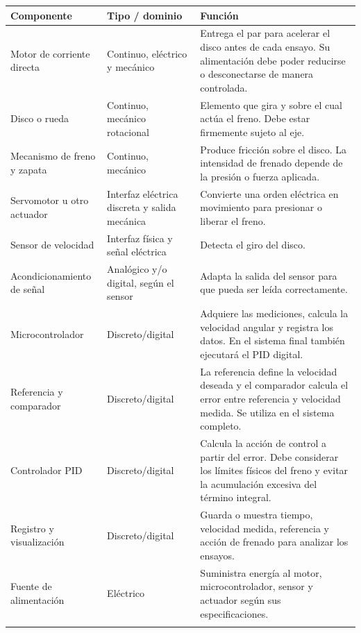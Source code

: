\documentclass[9pt,a4paper,twocolumn]{extarticle}
\renewcommand{\arraystretch}{1.08}
\begin{document}
\begin{center}\begingroup\setlength{\tabcolsep}{2pt}\renewcommand{\arraystretch}{1.15}\scriptsize
\begin{tabularx}{\columnwidth}{@{}YYY@{}}
\toprule
\textbf{Componente} & \textbf{Tipo / dominio} & \textbf{Función}\\
\midrule
Motor de corriente directa & Continuo, eléctrico y mecánico & Entrega el par para acelerar el disco antes de cada ensayo. Su alimentación debe poder reducirse o desconectarse de manera controlada.\\
\addlinespace[2pt]
Disco o rueda & Continuo, mecánico rotacional & Elemento que gira y sobre el cual actúa el freno. Debe estar firmemente sujeto al eje.\\
\addlinespace[2pt]
Mecanismo de freno y zapata & Continuo, mecánico & Produce fricción sobre el disco. La intensidad de frenado depende de la presión o fuerza aplicada.\\
\addlinespace[2pt]
Servomotor u otro actuador & Interfaz eléctrica discreta y salida mecánica & Convierte una orden eléctrica en movimiento para presionar o liberar el freno. \\
\addlinespace[2pt]
Sensor de velocidad & Interfaz física y señal eléctrica & Detecta el giro del disco. \\
\addlinespace[2pt]
Acondicionamiento de señal & Analógico y/o digital, según el sensor & Adapta la salida del sensor para que pueda ser leída correctamente.\\
\addlinespace[2pt]
Microcontrolador & Discreto/digital & Adquiere las mediciones, calcula la velocidad angular y registra los datos. En el sistema final también ejecutará el PID digital.\\
\addlinespace[2pt]
Referencia y comparador & Discreto/digital & La referencia define la velocidad deseada y el comparador calcula el error entre referencia y velocidad medida. Se utiliza en el sistema completo.\\
\addlinespace[2pt]
Controlador PID & Discreto/digital & Calcula la acción de control a partir del error. Debe considerar los límites físicos del freno y evitar la acumulación excesiva del término integral. \\
\addlinespace[2pt]
Registro y visualización & Discreto/digital & Guarda o muestra tiempo, velocidad medida, referencia y acción de frenado para analizar los ensayos.\\
\addlinespace[2pt]
Fuente de alimentación & Eléctrico & Suministra energía al motor, microcontrolador, sensor y actuador según sus especificaciones.\\
\addlinespace[2pt]
\bottomrule
\end{tabularx}\endgroup\end{center}
\end{document}

